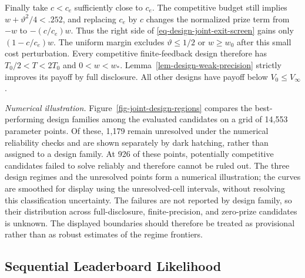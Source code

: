 \documentclass[mnsc]{informs3}
\begin{document}
\begin{APPENDICES}
{Finally take $c<c_e$ sufficiently close to $c_e$.
The competitive budget still implies $w+{\vartheta}^2/4<.252$,
and replacing $c_e$ by $c$ changes the normalized prize term from
$-w$ to $-(c/c_e)w$. Thus the right side of
\eqref{eq-design-joint-exit-screen} gains only $(1-c/c_e)w$.
The uniform margin excludes ${\vartheta}\leq1/2$ or $w\geq w_0$
after this small cost perturbation.
Every competitive finite-feedback design therefore has
$T_0/2<T<2T_0$ and $0<w<w_*$.
Lemma~\ref{lem-design-weak-precision} strictly improves its payoff
by full disclosure. All other designs have payoff below
$V_0\leq V_\infty$.
\Halmos
\endproof

}

\emph{Numerical illustration.}
Figure~\ref{fig-joint-design-regions} compares the best-performing design families among the evaluated candidates on a grid of 14,553 parameter points. Of these, 1,179 remain unresolved under the numerical reliability checks and are shown separately by dark hatching, rather than assigned to a design family. At 926 of these points, potentially competitive candidates failed to solve reliably and therefore cannot be ruled out. The three design regimes and the unresolved points form a numerical illustration; the curves are smoothed for display using the unresolved-cell intervals, without resolving this classification uncertainty.
{The failures are not reported by design family, so their distribution across full-disclosure, finite-precision, and zero-prize candidates is unknown. The displayed boundaries should therefore be treated as provisional rather than as robust estimates of the regime frontiers.}

\subsection{Sequential Leaderboard Likelihood}\label{app-leaderboard-recursion}


\end{APPENDICES}
\end{document}
